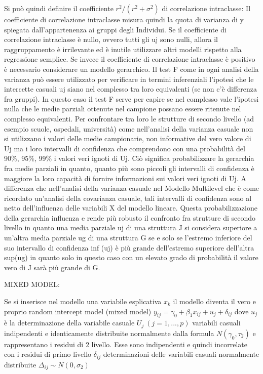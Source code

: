 \documentclass[a4page, 11pt]{article} %
\begin{document}
\newline
Si può quindi definire il coefficiente $r^{2} / (r^{2}+\sigma^{2})$  di  correlazione intraclasse: 
\newline
Il coefficiente di correlazione intraclasse misura quindi la quota di varianza di y spiegata dall’appartenenza ai gruppi degli Individui. Se il coefficiente di correlazione intraclasse è nullo, ovvero tutti gli uj sono nulli, allora il raggruppamento è irrilevante ed è inutile utilizzare altri modelli rispetto alla regressione semplice. Se invece il coefficiente di correlazione intraclasse è positivo è necessario considerare un modello gerarchico.
\newline
Il test F come in ogni analisi della varianza può essere utilizzato per verificare in termini inferenziali l’ipotesi che le intercette casuali uj siano nel complesso tra loro equivalenti (se non c’è differenza fra gruppi). In questo caso il test F serve per capire se nel complesso vale l’ipotesi nulla che le medie parziali ottenute nel campione possano essere ritenute nel complesso equivalenti. Per confrontare tra loro le strutture di secondo livello (ad esempio scuole, ospedali, università) come nell’analisi della varianza casuale non si utilizzano i valori delle medie campionarie, non informative del vero valore di Uj ma i loro intervalli di confidenza che comprendono con una probabilità del 90\%, 95\%, 99\% i valori veri ignoti di Uj.
\newline
Ciò significa probabilizzare la gerarchia fra medie parziali in quanto, quanto più sono piccoli gli intervalli di confidenza è maggiore la loro capacità di fornire informazioni sui valori veri ignoti di Uj. A differenza che nell’analisi della varianza casuale nel Modello Multilevel che è come ricordato un’analisi della covarianza casuale, tali intervalli di confidenza sono al netto dell’influenza delle variabili X del modello lineare. Questa probabilizzazione della gerarchia influenza e rende più robusto il confronto fra strutture di secondo livello in quanto una media parziale uj di una struttura J si considera superiore a un’altra media parziale ug di una struttura G se e solo se l’estremo inferiore del suo intervallo di confidenza inf (uj) è più grande dell’estremo superiore dell’altra sup(ug) in quanto solo in questo caso con un elevato grado di probabilità il valore vero di J sarà più grande di G.

MIXED MODEL: %

Se si inserisce nel modello una variabile esplicativa $x_k$ il modello diventa il vero e proprio random intercept model (mixed model) $y_{ij}=\gamma_0+\beta_1 x_{ij}+ u_j + \delta_{ij}$ dove $u_j$ è la determinazione della variabile casuale $U_j \ (j=1,...,p)$ variabili casuali indipendenti e identicamente distribuite normalmente dalla formula $N(\gamma_0, \tau_2)$ e rappresentano i residui di 2 livello. Esse sono indipendenti e quindi incorrelate con i residui di primo livello $\delta_{ij}$ determinazioni delle variabili casuali normalmente distribuite $\Delta_{ij} \sim N(0,\sigma_2)$
\end{document}
